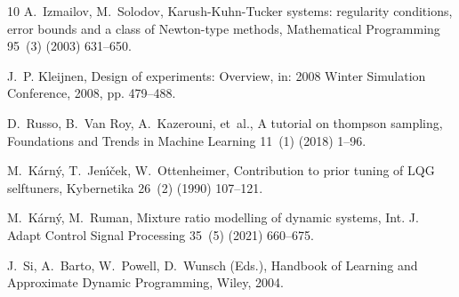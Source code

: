 \documentclass[final,3p,times,twocolumn]{elsarticle}
\begin{document}
\begin{thebibliography}{10}
A.~Izmailov, M.~Solodov, Karush-{K}uhn-{T}ucker systems: regularity conditions,
  error bounds and a class of {N}ewton-type methods, Mathematical Programming
  95~(3) (2003) 631--650.

J.~P. Kleijnen, Design of experiments: {O}verview, in: 2008 Winter Simulation
  Conference, 2008, pp. 479--488.

D.~Russo, B.~{Van Roy}, A.~Kazerouni, et~al., A tutorial on thompson sampling,
  Foundations and Trends in Machine Learning 11~(1) (2018) 1--96.

M.~K\'{a}rn\'{y}, T.~Jen\'{\i}\v{c}ek, W.~Ottenheimer, Contribution to prior
  tuning of {LQG} selftuners, Kybernetika 26~(2) (1990) 107--121.

M.~K\'{a}rn\'{y}, M.~Ruman, Mixture ratio modelling of dynamic systems, Int. J.
  Adapt Control Signal Processing 35~(5) (2021) 660--675.

J.~Si, A.~Barto, W.~Powell, D.~Wunsch (Eds.), Handbook of Learning and
  Approximate Dynamic Programming, Wiley, 2004.

\end{thebibliography}

%
%
%
\end{document}
